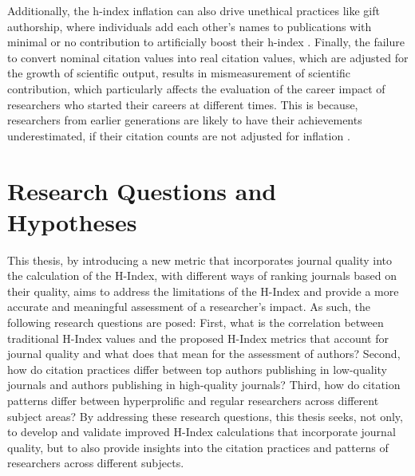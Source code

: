 Additionally, the h-index inflation can also drive unethical practices like
gift authorship, where individuals add each other’s names to publications with
minimal or no contribution to artificially boost their h-index
\cite{bi2023four}. Finally, the failure to convert nominal citation values into
real citation values, which are adjusted for the growth of scientific output,
results in mismeasurement of scientific contribution, which particularly
affects the evaluation of the career impact of researchers who started their
careers at different times. This is because, researchers from earlier
generations are likely to have their achievements underestimated, if their
citation counts are not adjusted for inflation \cite{petersen2019methods}.

\section{Research Questions and Hypotheses}
This thesis, by introducing a new metric that incorporates journal quality into
the calculation of the H-Index, with different ways of ranking journals based
on their quality, aims to address the limitations of the H-Index and provide a
more accurate and meaningful assessment of a researcher's impact. As such, the
following research questions are posed: First, what is the correlation between
traditional H-Index values and the proposed H-Index metrics that account for
journal quality and what does that mean for the assessment of authors? Second,
how do citation practices differ between top authors publishing in low-quality
journals and authors publishing in high-quality journals? Third, how do
citation patterns differ between hyperprolific and regular researchers across
different subject areas? By addressing these research questions, this thesis
seeks, not only, to develop and validate improved H-Index calculations that
incorporate journal quality, but to also provide insights into the citation
practices and patterns of researchers across different subjects.